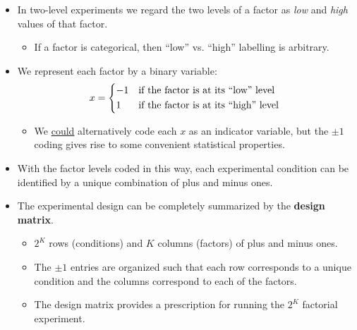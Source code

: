 \begin{itemize}
      \item In two-level experiments we regard the two levels of a factor as \emph{low} and \emph{high} values of that factor.
            \begin{itemize}[*]
                  \item If a factor is categorical, then ``low'' vs. ``high'' labelling is arbitrary.
            \end{itemize}
      \item We represent each factor by a binary variable:
            \[ x=\begin{cases*}
                        -1 & if the factor is at its ``low'' level  \\
                        1  & if the factor is at its ``high'' level
                  \end{cases*} \]
            \begin{itemize}[*]
                  \item We \underline{could} alternatively code each $ x $ as an indicator variable, but the $ \pm 1 $ coding
                        gives rise to some convenient statistical properties.
            \end{itemize}
\end{itemize}
\begin{itemize}[$\rightarrow$]
      \item With the factor levels coded in this way, each experimental condition can be identified by a unique
            combination of plus and minus ones.
\end{itemize}
\begin{itemize}
      \item The experimental design can be completely summarized by the \textbf{design matrix}.
            \begin{itemize}
                  \item $ 2^K $ rows (conditions) and $ K $ columns (factors) of plus and minus ones.
            \end{itemize}
            \begin{itemize}[$\rightarrow$]
                  \item The $ \pm 1 $ entries are organized such that each row corresponds to a unique condition and the
                        columns correspond to each of the factors.
                  \item The design matrix provides a prescription for running the $2^K$ factorial experiment.
            \end{itemize}
\end{itemize}

